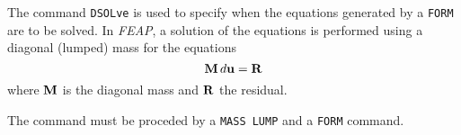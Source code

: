 \headb

The command {\tt DSOLve} is used to specify when the
equations generated by a {\tt FORM} are to be solved.  In {\sl FEAP},
a solution of the equations is performed using a diagonal (lumped)
mass for the equations
\begin{displaymath}
\mathbf{M} \, d\mathbf{u} = \mathbf{R}
\end{displaymath}
where $\mathbf{M}$ is the diagonal mass and $\mathbf{R}$ the residual.

The command must be proceded by a \texttt{MASS LUMP} and a \texttt{FORM}
command.
\vfill\eject
